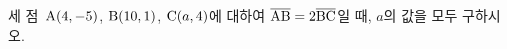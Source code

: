 세 점~$\mathrm{A}(4{,}\mkern3mu\mathopen{}-5)$, $\mathrm{B}(10{,}\mkern3mu\mathopen{}1)$, $\mathrm{C}(a{,}\mkern3mu\mathopen{}4)$에 대하여 $\overline{\mathrm{AB}}=2\overline{\mathrm{BC}}$일 때, $a$의 값을 모두 구하시오.
